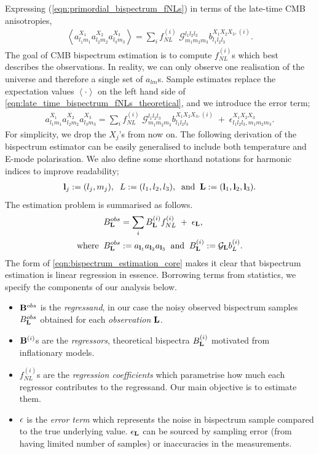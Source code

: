 Expressing (\ref{eqn:primordial_bispectrum_fNLs}) in terms of the late-time CMB anisotropies,
\begin{align}
	\left< a_{l_1 m_1}^{X_1} a_{l_2 m_2}^{X_2} a_{l_3 m_3}^{X_3}  \right> = \sum_i f^{(i)}_{NL} \; \mathcal{G}^{l_1 l_2 l_3}_{m_1 m_2 m_3} b^{X_1 X_2 X_3, (i)}_{l_1 l_2 l_3}. \label{eqn:late_time_bispectrum_fNLs_theoretical}
\end{align}
The goal of CMB bispectrum estimation is to compute $f^{(i)}_{NL}$s which best describes the observations. In reality, we can only observe one realisation of the universe and therefore a single set of $a_{lm}$s. Sample estimates replace the expectation values $\left< \cdot \right>$ on the left hand side of \eqref{eqn:late_time_bispectrum_fNLs_theoretical}, and we introduce the error term;
\begin{align}
	a_{l_1 m_1}^{X_1} a_{l_2 m_2}^{X_2} a_{l_3 m_3}^{X_3} = \sum_i  f^{(i)}_{NL} \; \mathcal{G}^{l_1 l_2 l_3}_{m_1 m_2 m_3} b^{X_1 X_2 X_3, (i)}_{l_1 l_2 l_3} \;+\; \epsilon^{X_1 X_2 X_3}_{l_1 l_2 l_3, m_1 m_2 m_3}. \label{eqn:late_time_bispectrum_fNLs_sample}
\end{align}
For simplicity, we drop the $X_j$'s from now on. The following derivation of the bispectrum estimator can be easily generalised to include both temperature and E-mode polarisation. We also define some shorthand notations for harmonic indices to improve readability;
\begin{align}
	\mathbf{l}_j:=(l_j,m_j), \;\; L:=(l_1,l_2,l_3), \;\; \text{and} \;\; \mathbf{L}:=(\mathbf{l}_1, \mathbf{l}_2, \mathbf{l}_3).
\end{align}
The estimation problem is summarised as follows.
\begin{align}
	&B^{obs}_\mathbf{L} = \sum_i B^{(i)}_\mathbf{L} f^{(i)}_{NL}  \;+\; \epsilon_\mathbf{L}, \label{eqn:bispectrum_estimation_core}\\
	\text{where} \;\; &B^{obs}_\mathbf{L} := a_{\mathbf{l}_1} a_{\mathbf{l}_2} a_{\mathbf{l}_3} \;\; \text{and} \;\; B^{(i)}_\mathbf{L} := \mathcal{G}_\mathbf{L} b^{(i)}_L.
\end{align}
The form of \eqref{eqn:bispectrum_estimation_core} makes it clear that bispectrum estimation is linear regression in essence. Borrowing terms from statistics, we specify the components of our analysis below.
\begin{itemize}
	\item $\mathbf{B}^{obs}$ is the \textit{regressand}, in our case the noisy observed bispectrum samples $B^{obs}_\mathbf{L}$ obtained for each \textit{observation} $\mathbf{L}$.
	\item $\mathbf{B}^{(i)}$s are the \textit{regressors}, theoretical bispectra $B^{(i)}_\mathbf{L}$ motivated from inflationary models.
	\item $f^{(i)}_{NL}$s are the \textit{regression coefficients} which parametrise how much each regressor contributes to the regressand. Our main objective is to estimate them.
	\item $\mathbf{\epsilon}$ is the \textit{error term} which represents the noise in bispectrum sample compared to the true underlying value. $\epsilon_\mathbf{L}$ can be sourced by sampling error (from having limited number of samples) or inaccuracies in the measurements. 
\end{itemize}

